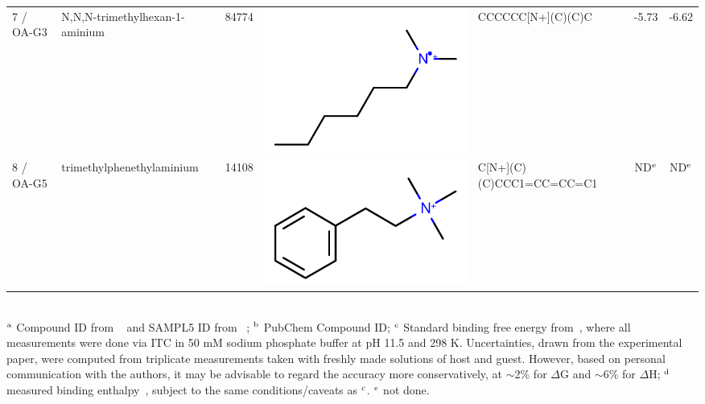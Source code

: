 \documentclass[aps,pre,twocolumn,nofootinbib,superscriptaddress,10pt, final,tightenlines]{revtex4-1}
\begin{document}
\begin{table}
\begin{tabular}{lllp{1.5cm}>{\ttfamily}lS[table-format=-1.3, table-figures-uncertainty=1]S[table-format=-1.2, table-figures-uncertainty=1]}
7 / OA-G3    & N,N,N-trimethylhexan-1-aminium      & 84774            & \parbox[c]{1em}{\includegraphics[scale=0.15]{figures/84774.pdf}}    & CCCCCC[N+](C)(C)C                  & -5.73      & -6.62       \\ 
8 / OA-G5    & trimethylphenethylaminium           & 14108            & \parbox[c]{1em}{\includegraphics[scale=0.15]{figures/14108.pdf}}    & C[N+](C)(C)CCC1=CC=CC=C1           & {ND$^{\rm e}$}       & {ND$^{\rm e}$}      \\
\bottomrule
\end{tabular}\\
$^{\rm a}$ Compound ID from ~\cite{sullivan_binding_2016} and SAMPL5 ID from ~\cite{yin_overview_2016}; $^{\rm b}$ PubChem Compound ID; $^{\rm c}$ Standard binding free energy from~\cite{sullivan_binding_2016}, where all measurements were done via ITC in 50 mM sodium phosphate buffer at pH 11.5 and 298 K. Uncertainties, drawn from the experimental paper, were computed from triplicate measurements taken with freshly made solutions of host and guest. However, based on personal communication with the authors, it may be advisable to regard the accuracy more conservatively, at $\sim$2\% for $\Delta$G and $\sim$6\% for $\Delta$H;  $^{\rm d}$ measured binding enthalpy~\cite{sullivan_binding_2016}, subject to the same conditions/caveats as $^{\rm c}$. $^{\rm e}$ not done.
\end{table}
\endgroup
\end{document}
